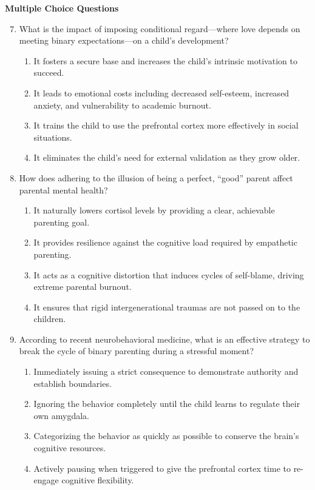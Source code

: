 \begin{practiceexercise}
\textbf{Multiple Choice Questions}
\begin{enumerate}
  \setcounter{enumi}{6}
  \item What is the impact of imposing conditional regard---where love depends on meeting binary expectations---on a child's development?
  \begin{enumerate}
    \item It fosters a secure base and increases the child's intrinsic motivation to succeed.
    \item It leads to emotional costs including decreased self-esteem, increased anxiety, and vulnerability to academic burnout.
    \item It trains the child to use the prefrontal cortex more effectively in social situations.
    \item It eliminates the child's need for external validation as they grow older.
  \end{enumerate}
  \vspace{\fill}
  \item How does adhering to the illusion of being a perfect, ``good'' parent affect parental mental health?
  \begin{enumerate}
    \item It naturally lowers cortisol levels by providing a clear, achievable parenting goal.
    \item It provides resilience against the cognitive load required by empathetic parenting.
    \item It acts as a cognitive distortion that induces cycles of self-blame, driving extreme parental burnout.
    \item It ensures that rigid intergenerational traumas are not passed on to the children.
  \end{enumerate}
  \vspace{\fill}
  \item According to recent neurobehavioral medicine, what is an effective strategy to break the cycle of binary parenting during a stressful moment?
  \begin{enumerate}
    \item Immediately issuing a strict consequence to demonstrate authority and establish boundaries.
    \item Ignoring the behavior completely until the child learns to regulate their own amygdala.
    \item Categorizing the behavior as quickly as possible to conserve the brain's cognitive resources.
    \item Actively pausing when triggered to give the prefrontal cortex time to re-engage cognitive flexibility.
  \end{enumerate}
\end{enumerate}
\vspace{\fill}
\newpage


\end{practiceexercise}
